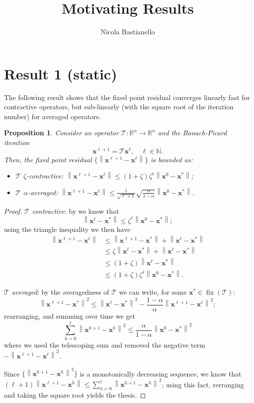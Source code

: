 \documentclass[11pt,a4paper]{article}
\author{Nicola Bastianello}
\title{Motivating Results}
\DeclareMathOperator{\fix}{fix}
\newcommand{\norm}[1]{\left\lVert#1\right\rVert}
\theoremstyle{plain} %
\newtheorem{proposition}[theorem]{Proposition}
\theoremstyle{definition} %
\theoremstyle{remark} %
\newcommand{\R}{\mathbb{R}}
\newcommand{\N}{\mathbb{N}}
\newcommand{\x}{\mathbold{x}}
\newcommand{\T}{\mathcal{T}}
\begin{document}
\maketitle

\section{Result 1 (static)}
The following result shows that the fixed point residual converges linearly fast for contractive operators, but sub-linearly (with the square root of the iteration number) for averaged operators.

\begin{proposition}
Consider an operator $\T : \R^n \to \R^n$ and the Banach-Picard iteration
$$
	\x^{\ell+1} = \T \x^\ell, \quad \ell \in \N.
$$
Then, the fixed point residual $\{ \norm{\x^{\ell+1} - \x^\ell} \}$ is bounded as:
\begin{itemize}
	\item \emph{$\T$ $\zeta$-contractive}: $\norm{\x^{\ell+1} - \x^\ell} \leq (1 + \zeta) \zeta^\ell \norm{\x^0 - \x^*}$;
	
	\item \emph{$\T$ $\alpha$-averaged}: $\norm{\x^{\ell+1} - \x^\ell} \leq \frac{1}{\sqrt{\ell+1}} \sqrt{\frac{\alpha}{1 - \alpha}} \norm{\x^0 - \x^*}$.
\end{itemize}
\end{proposition}
%
\begin{proof}
\emph{$\T$ contractive}: by \cite[Theorem~1.50]{bauschke_convex_2017} we know that
$$
	\norm{\x^\ell - \x^*} \leq \zeta^\ell \norm{\x^0 - \x^*};
$$
using the triangle inequality we then have
\begin{align*}
	\norm{\x^{\ell+1} - \x^\ell} &\leq \norm{\x^{\ell+1} - \x^*} + \norm{\x^\ell - \x^*} \\
	&\leq \zeta \norm{\x^\ell - \x^*} + \norm{\x^\ell - \x^*} \\
	&\leq (1 + \zeta) \norm{\x^\ell - \x^*} \\
	&\leq (1 + \zeta) \zeta^\ell \norm{\x^0 - \x^*}.
\end{align*}

\emph{$\T$ averaged}: by the averagedness of $\T$ we can write, for some $\x^* \in \fix(\T)$:
$$
	\norm{\x^{\ell+1} - \x^*}^2 \leq \norm{\x^\ell - \x^*}^2 - \frac{1 - \alpha}{\alpha} \norm{\x^{\ell+1} - \x^\ell}^2;
$$
rearranging, and summing over time we get
$$
	\sum_{h = 0}^\ell \norm{\x^{h+1} - \x^h}^2 \leq \frac{\alpha}{1 - \alpha} \norm{\x^0 - \x^*}^2
$$
where we used the telescoping sum and removed the negative term $- \norm{\x^{\ell+1} - \x^\ell}^2$.

Since $\{ \norm{\x^{h+1} - \x^h}^2 \}$ is a monotonically decreasing sequence, we know that $(\ell+1) \norm{\x^{\ell+1} - \x^h} \leq \sum_{h = 0}^\ell \norm{\x^{h+1} - \x^h}^2$; using this fact, rerranging and taking the square root yields the thesis.
\end{proof}
\end{document}
